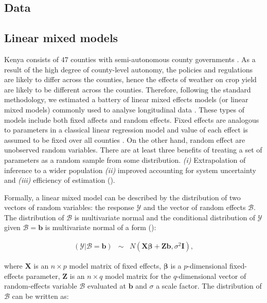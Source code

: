 \documentclass[a4paper,12pt]{article}
\begin{document}
\subsection{Data}

\subsection{Linear mixed models}
\sloppy
Kenya consists of $47$ counties with semi-autonomous county governments  \citep{Barasa2017}. As a result of the high degree of county-level autonomy, the policies and regulations are likely to differ across the counties, hence the effects of weather on crop yield are likely to be different across the counties. Therefore, following the standard methodology, we estimated a battery of linear mixed effects models (or linear mixed models) commonly used to analyse longitudinal data \citep{bates2000mixed}. These types of models include both fixed affects and random effects. Fixed effects are analogous to parameters in a classical linear regression model and value of each effect is assumed to be fixed over all counties \citep{bates2010lme4}. On the other hand, random effect are unobserved random variables. There are at least three benefits of treating a set of parameters as a random sample from some distribution. \textit{(i)} Extrapolation of inference to a wider population \textit{(ii)} improved accounting for system uncertainty and \textit{(iii)} efficiency of estimation (\citealp{KERYch9,KERYch12}).

Formally, a linear mixed model can be described by the distribution of two vectors of random variables: the response $\mathscr{Y}$ and the vector of random effects $\mathscr{B}$. The distribution of $\mathscr{B}$ is multivariate normal and the conditional distribution of $\mathscr{Y}$ given $\mathscr{B}=\mathbf{b}$ is multivariate normal of a form (\citealp{bates2010lme4, KERYch9}):




\begin{equation}\label{MixedGeneral}
\begin{array}{lcl}

(\mathscr{Y}|\mathscr{B}=\mathbf{b})& \sim & \mathit{N}(\mathbf{X}\mathbf{\beta}+\mathbf{Z}\mathbf{b},\sigma^2\mathbf{I}),

\end{array}
\end{equation}

where $\mathbf{X}$ is an $n \times p$ model matrix of fixed effects, $\mathbf{\beta}$ is a $p$-dimensional fixed-effects parameter, $\mathbf{Z}$ is an $n \times q$ model matrix for the $q$-dimensional vector of random-effects variable $\mathscr{B}$ evaluated at $\mathbf{b}$ and $\sigma$ a scale factor. The distribution of $\mathscr{B}$ can be written as: 
\end{document}
